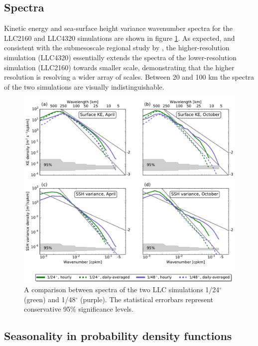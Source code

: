 \documentclass[grl]{agutex2015}
\begin{document}
\begin{article}
\subsection*{Spectra}
Kinetic energy and sea-surface height variance wavenumber spectra for the LLC2160
and LLC4320 simulations are shown in figure \ref{figS2_3}. As expected, and
consistent with the submesoscale regional study by \cite{capet_etal2008a}, the
higher-resolution simulation (LLC4320) essentially extends the spectra of the
lower-resolution simulation (LLC2160) towards smaller scale, demonstrating that
the higher resolution is resolving a wider array of scales. Between 20 and 100 km
the spectra of the two simulations are visually indistinguishable.


\begin{figure}[ht]
   \begin{center}
     \includegraphics[width=1.\textwidth]{figs/fig_s2_3.pdf}
  \caption{A comparison between spectra of the two LLC simulations 1/24$^\circ$
  (green) and 1/48$^\circ$ (purple). The statistical errorbars represent conservative
  95$\%$ significance levels.}
  \label{figS2_3}
  \end{center}
\end{figure}

\subsection*{Seasonality in probability density functions}


\end{article}
\end{document}
